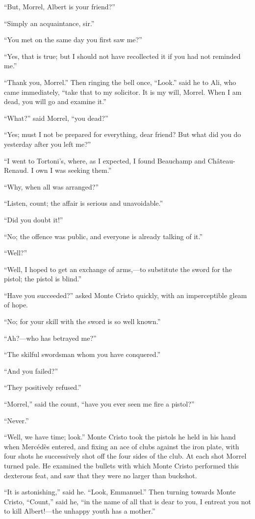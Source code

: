 “But, Morrel, Albert is your friend?”

“Simply an acquaintance, sir.”

“You met on the same day you first saw me?”

“Yes, that is true; but I should not have recollected it if you had not
reminded me.”

“Thank you, Morrel.” Then ringing the bell once, “Look.” said he to
Ali, who came immediately, “take that to my solicitor. It is my will,
Morrel. When I am dead, you will go and examine it.”

“What?” said Morrel, “you dead?”

“Yes; must I not be prepared for everything, dear friend? But what did
you do yesterday after you left me?”

“I went to Tortoni’s, where, as I expected, I found Beauchamp and
Château-Renaud. I own I was seeking them.”

“Why, when all was arranged?”

“Listen, count; the affair is serious and unavoidable.”

“Did you doubt it!”

“No; the offence was public, and everyone is already talking of it.”

“Well?”

“Well, I hoped to get an exchange of arms,—to substitute the sword for
the pistol; the pistol is blind.”

“Have you succeeded?” asked Monte Cristo quickly, with an imperceptible
gleam of hope.

“No; for your skill with the sword is so well known.”

“Ah?—who has betrayed me?”

“The skilful swordsman whom you have conquered.”

“And you failed?”

“They positively refused.”

“Morrel,” said the count, “have you ever seen me fire a pistol?”

“Never.”

“Well, we have time; look.” Monte Cristo took the pistols he held in
his hand when Mercédès entered, and fixing an ace of clubs against the
iron plate, with four shots he successively shot off the four sides of
the club. At each shot Morrel turned pale. He examined the bullets with
which Monte Cristo performed this dexterous feat, and saw that they
were no larger than buckshot.

“It is astonishing,” said he. “Look, Emmanuel.” Then turning towards
Monte Cristo, “Count,” said he, “in the name of all that is dear to
you, I entreat you not to kill Albert!—the unhappy youth has a mother.”

